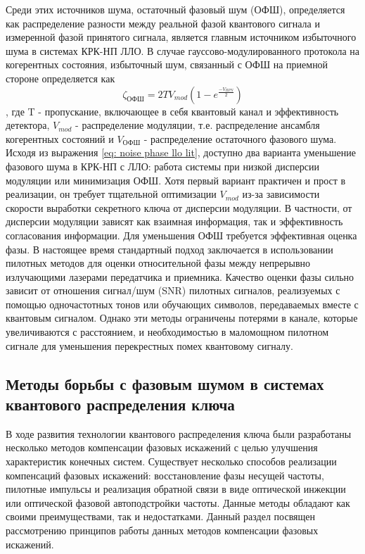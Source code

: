 Среди этих источников шума, остаточный фазовый шум (ОФШ), определяется как распределение разности между реальной фазой квантового сигнала и измеренной фазой принятого сигнала, является главным источником избыточного шума в системах КРК-НП ЛЛО. В случае гауссово-модулированного протокола на когерентных состояния, избыточный шум, связанный с ОФШ на приемной стороне определяется как 
\begin{equation}
    \zeta_{ОФШ} = 2TV_{mod}(1-e^\frac{-V_{RPN}}{2}) 
\end{equation}\label{eq: noise phase llo lit}, где T - пропускание, включающее в себя квантовый канал и эффективность детектора, $V_{mod}$ - распределение модуляции, т.е. распределение ансамбля когерентных состояний и $V_{ОФШ}$ - распределение остаточного фазового шума.
Исходя из выражения \ref{eq: noise phase llo lit}, доступно два варианта уменьшение фазового шума в КРК-НП с ЛЛО: работа системы при низкой дисперсии модуляции или минимизация ОФШ. Хотя первый вариант практичен и прост в реализации, он требует тщательной оптимизации $V_{mod}$ из-за зависимости скорости выработки секретного ключа от дисперсии модуляции. В частности, от дисперсии модуляции зависят как взаимная информация, так и эффективность согласования информации.
Для уменьшения ОФШ требуется эффективная оценка фазы. В настоящее время стандартный подход заключается в использовании пилотных методов для оценки относительной фазы между непрерывно излучающими лазерами  передатчика и приемника. Качество оценки фазы сильно зависит от отношения сигнал/шум (SNR) пилотных сигналов, реализуемых с помощью одночастотных тонов или обучающих символов, передаваемых вместе с квантовым сигналом. Однако эти методы ограничены потерями в канале, которые увеличиваются с расстоянием, и необходимостью в маломощном пилотном сигнале для уменьшения перекрестных помех квантовому сигналу.

\subsection{Методы борьбы с фазовым шумом в системах квантового распределения ключа}\label{sec:ch1/sect5/subsec1}
В ходе развития технологии квантового распределения ключа были разработаны несколько методов компенсации фазовых искажений с целью улучшения характеристик конечных систем. Существует несколько способов реализации компенсаций фазовых искажений: восстановление фазы несущей частоты, пилотные импульсы и реализация обратной связи в виде оптической инжекции или оптической фазовой автоподстройки частоты. Данные методы обладают как своими преимуществами, так и недостатками. Данный раздел посвящен рассмотрению принципов работы данных методов компенсации фазовых искажений. 
